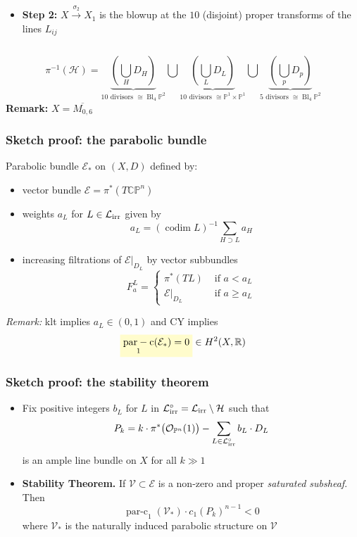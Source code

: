 \documentclass{beamer}
\newcommand{\R}{\mathbb{R}}
\renewcommand{\P}{\mathbb{P}}
\newcommand{\CP}{\mathbb{CP}}
\newcommand{\mE}{\mathcal{E}}
\newcommand{\mO}{\mathcal{O}}
\newcommand{\mH}{\mathcal{H}}
\newcommand{\mV}{\mathcal{V}}
\newcommand{\mLi}{\mathcal{L}_{\textup{irr}}}
\DeclareMathOperator{\codim}{codim}
\DeclareMathOperator{\parc}{par-c}
\DeclareMathOperator{\Bl}{Bl}
\newcommand{\mathcolorbox}[2]{\colorbox{#1}{$\displaystyle #2$}}
\begin{document}
\begin{frame}
\begin{columns}
\begin{column}{.68\textwidth}
\begin{itemize}
				\item \textbf{Step 2:} \(X \xrightarrow{\sigma_2} X_1\) is the blowup at the \(10\) (disjoint) proper transforms of the  lines \(L_{ij}\)
			\end{itemize}
		\end{column}
	\end{columns}
	
\footnotesize{
	\begin{equation*}	
		\pi^{-1}(\mH) = \underbrace{\left( \bigcup_{H} D_H \right)}_{10 \text{ divisors } \cong \Bl_4 \P^2} \bigcup \underbrace{\left( \bigcup_{L} D_L \right)}_{10 \text{ divisors } \cong \P^1 \times \P^1} \bigcup \underbrace{\left( \bigcup_{p} D_p \right)}_{5 \text{ divisors } \cong \Bl_4 \P^2} 
	\end{equation*}
}	
\vfill
\normalsize
\pause	
\textbf{Remark:} \(X = \overline{M_{0,6}}\)
\end{frame}

\begin{frame}
	\frametitle{Sketch proof: the parabolic bundle}
	Parabolic bundle \(\mE_{*}\) on \((X,D)\) defined by:
	\begin{itemize}
		\pause
		\item vector bundle \(\mE = \pi^*(T\CP^n)\)
		\pause
		\item weights \(a_L\) for \(L \in \mLi\) given by
		\[
		a_L = (\codim L)^{-1} \sum_{H \supset L} a_H 
		\]
		\pause
		\item increasing filtrations of \(\mE|_{D_L}\) by vector subbundles 
		\begin{equation*}
		F^L_a = 
		\begin{cases}
		\pi^*(TL) &\text{ if } a < a_L \\
		\mE|_{D_L} &\text{ if } a \geq a_L 
		\end{cases}
		\end{equation*}	
	\end{itemize}
	\pause
\emph{Remark:} klt implies \(a_L \in (0,1)\) and 
CY implies 
\[
\mathcolorbox{yellow!20}{\parc_1(\mE_{*}) = 0} \in H^2(X, \R)
\]
\end{frame}


\begin{frame}
	\frametitle{Sketch proof: the stability theorem}
	\begin{itemize}
		\pause
		\item Fix positive integers \(b_L\) for \(L\) in \( \mLi^{\circ} = \mLi \setminus \mH\) such  that
		\begin{equation*}
		P_k = k \cdot \pi^*\big(\mO_{\P^n}(1)\big) - \sum_{L \in \mLi^{\circ}} b_L \cdot D_L
		\end{equation*}
		is an ample line bundle on \(X\) for all \(k \gg 1\)
		\vfill
		
		\pause
		\item \textbf{Stability Theorem.}
		If \(\mV \subset \mE\) is a non-zero and proper \emph{saturated subsheaf}. Then
		\[
		\parc_{1}(\mV_{*}) \cdot c_1(P_k)^{n-1} < 0 
		\]
		where \(\mV_{*}\) is the naturally induced parabolic structure on \(\mV\)
	\end{itemize}
\end{frame}
\end{document}
